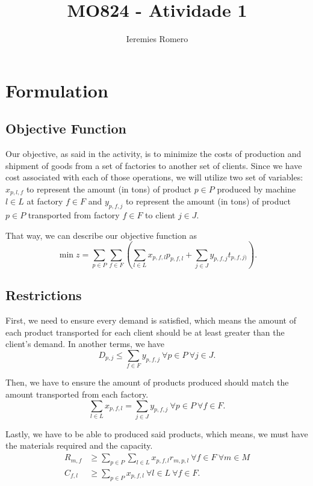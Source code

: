 \documentclass[11pt]{article}
\author{Ieremies Romero}
\date{}
\title{MO824 - Atividade 1}
\theoremstyle{definition}
\theoremstyle{definition}
\theoremstyle{remark}
\theoremstyle{remark}
\theoremstyle{remark}
\theoremstyle{remark}
\theoremstyle{definition}
\begin{document}
\maketitle

\section*{Formulation}
\label{sec:org756f348}
\subsection*{Objective Function}
\label{sec:org806f9ba}
Our objective, as said in the activity, is to minimize the costs of production and shipment of goods from a set of factories to another set of clients. Since we have cost associated with each of those operations, we will utilize two set of variables: \(x_{p,l,f}\) to represent the amount (in tons) of product \(p \in P\) produced by machine \(l \in L\) at factory \(f \in F\) and \(y_{p, f, j}\) to represent the amount (in tons) of product \(p \in P\) transported from factory \(f \in F\) to client \(j \in J\).

That way, we can describe our objective function as
\[ \min z = \sum \limits_{p \in P} \sum_{f \in F} (\sum \limits_{l \in L} x_{p,f,l}p_{p,f,l} + \sum_{j \in J} y_{p,f,j}t_{p,f,j)}). \]
\subsection*{Restrictions}
\label{sec:orgf21f41b}
First, we need to ensure every demand is satisfied, which means the amount of each product transported for each client should be at least greater than the client's demand. In another terms, we have
\[ D_{p,j} \leq \sum_{f \in F} y_{p,f,j} \ \forall p \in P \ \forall j \in J. \]

Then, we have to ensure the amount of products produced should match the amount transported from each factory.
\[ \sum \limits_{l \in L} x_{p,f,l} = \sum_{j \in J} y_{p,f,j} \ \forall p \in P \ \forall f \in F . \]

Lastly, we have to be able to produced said products, which means, we must have the materials required and the capacity.
\begin{align*}
R_{m,f} &\geq \sum \limits_{p \in P} \sum \limits_{l \in L} x_{p,f,l}r_{m,p,l} \ \forall f \in F \ \forall m \in M \\
C_{f,l} &\geq \sum_{p \in P} x_{p,f,l} \ \forall l \in L \ \forall f \in F.
\end{align*}
\end{document}
